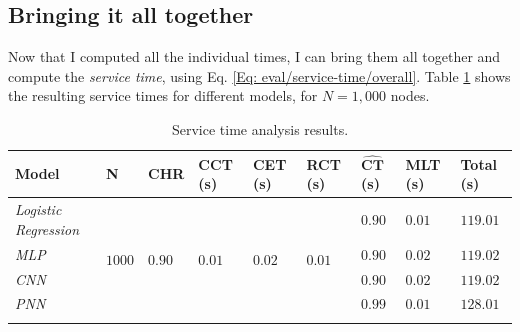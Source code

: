 			\subsection{Bringing it all together} \label{Section: eval/service-time/together}
			Now that I computed all the individual times, I can bring them all together and compute the \textit{service time}, using Eq. \ref{Eq: eval/service-time/overall}. Table \ref{Table: eval/service-time/together/overall} shows the resulting service times for different models, for $N=1,000$ nodes.
			\newpage
			\begin{longtable}{|p{}||p{.08\textwidth}|p{}|p{}|p{}|p{}|p{}|p{}||p{}|}
				\textbf{Model} & \textbf{N} & \textbf{CHR}  &\textbf{CCT} (s) & \textbf{CET} (s) & \textbf{RCT} (s)& $\mathbf{\hat{CT}}$ (s)& \textbf{MLT} (s) & \textbf{Total} (s)\\
				\hline
				\textit{Logistic Regression} & \multirow{5}{*}{$1000$} & \multirow{5}{*}{$0.90$} & \multirow{5}{*}{$0.01$} & \multirow{5}{*}{$0.02$} & \multirow{5}{*}{$0.01$} & $0.90$ & $0.01$ & \cellcolor{green!20} $\mathbf{119.01}$ \\
				\hhline{-~~~~---}
				\textit{MLP} &  &  &   & &  & $0.90$ & $0.02$ &\cellcolor{green!20} $\mathbf{119.02}$  \\
				\hhline{-~~~~---}
				\textit{CNN} &  &  &  & &  & $0.90$ & $0.02$ & \cellcolor{green!20} $\mathbf{119.02}$ \\
				\hhline{-~~~~---}
				\hhline{-~~~~---}
				\textit{PNN} &  &  &  & &  & $0.99$ & $0.01$ & \cellcolor{green!20} $\mathbf{128.01}$ \\
				\hline
				\caption{Service time analysis results.}
				\label{Table: eval/service-time/together/overall}
			\end{longtable}
			
